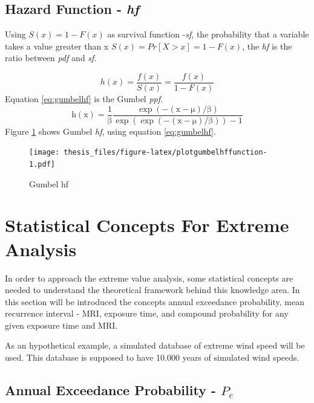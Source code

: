 \documentclass[12pt,oneside]{reedthesis}
\begin{document}
\hypertarget{hf}{%
\subsection{\texorpdfstring{Hazard Function - \emph{hf}}{Hazard Function - hf}}\label{hf}}

Using \(S(x) = 1 - F(x)\) as survival function -\emph{sf}, the probability that a variable takes a value greater than x \(S(x) = Pr[X > x] = 1 - F(x)\), the \emph{hf} is the ratio between \emph{pdf} and \emph{sf}.

\[
h(x) = \frac{f(x)}{S(x)} = \frac{f(x)}{1-F(x)}
\]
Equation \eqref{eq:gumbelhf} is the Gumbel \emph{ppf}.
\begin{equation}
\mathrm{
        h(x)= \frac{1}{\beta}\frac{\exp(-(x-\mu)/\beta)}{\exp(\exp(-(x-\mu)/\beta))-1}
       }
  \label{eq:gumbelhf}
\end{equation}
Figure \ref{fig:plotgumbelhffunction} shows Gumbel \emph{hf}, using equation \eqref{eq:gumbelhf}.

\footnotesize
\begin{figure}
\centering
\texttt{[image: thesis\_files/figure-latex/plotgumbelhffunction-1.pdf]}
\caption{\label{fig:plotgumbelhffunction}Gumbel hf}
\end{figure}
\normalsize

\hypertarget{statistical-concepts-for-extreme-analysis}{%
\section{Statistical Concepts For Extreme Analysis}\label{statistical-concepts-for-extreme-analysis}}

In order to approach the extreme value analysis, some statistical concepts are needed to understand the theoretical framework behind this knowledge area. In this section will be introduced the concepts annual exceedance probability, mean recurrence interval - MRI, exposure time, and compound probability for any given exposure time and MRI.

As an hypothetical example, a simulated database of extreme wind speed will be used. This database is supposed to have 10.000 years of simulated wind speeds.

\hypertarget{annual-exceedance-probability---p_e}{%
\subsection{\texorpdfstring{Annual Exceedance Probability - \(P_e\)}{Annual Exceedance Probability - P\_e}}\label{annual-exceedance-probability---p_e}}
\end{document}
